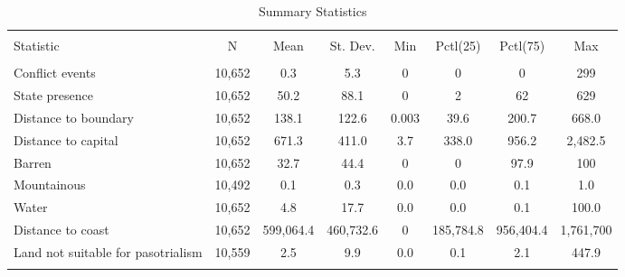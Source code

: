 
\begin{sidewaystable}[!htbp] \centering 
  \caption{Summary Statistics} 
  \label{summarystats} 
\begin{tabular}{@{\extracolsep{1pt}}lccccccc} 
\\[-1.8ex]\hline 
\hline \\[-1.8ex] 
Statistic & \multicolumn{1}{c}{N} & \multicolumn{1}{c}{Mean} & \multicolumn{1}{c}{St. Dev.} & \multicolumn{1}{c}{Min} & \multicolumn{1}{c}{Pctl(25)} & \multicolumn{1}{c}{Pctl(75)} & \multicolumn{1}{c}{Max} \\ 
\hline \\[-1.8ex] 
Conflict events & 10,652 & 0.3 & 5.3 & 0 & 0 & 0 & 299 \\ 
State presence & 10,652 & 50.2 & 88.1 & 0 & 2 & 62 & 629 \\ 
Distance to boundary & 10,652 & 138.1 & 122.6 & 0.003 & 39.6 & 200.7 & 668.0 \\ 
Distance to capital & 10,652 & 671.3 & 411.0 & 3.7 & 338.0 & 956.2 & 2,482.5 \\ 
Barren & 10,652 & 32.7 & 44.4 & 0 & 0 & 97.9 & 100 \\ 
Mountainous & 10,492 & 0.1 & 0.3 & 0.0 & 0.0 & 0.1 & 1.0 \\ 
Water & 10,652 & 4.8 & 17.7 & 0.0 & 0.0 & 0.1 & 100.0 \\ 
Distance to coast & 10,652 & 599,064.4 & 460,732.6 & 0 & 185,784.8 & 956,404.4 & 1,761,700 \\ 
Land not suitable for pasotrialism & 10,559 & 2.5 & 9.9 & 0.0 & 0.1 & 2.1 & 447.9 \\ 
\hline \\[-1.8ex] 
\end{tabular} 
\end{sidewaystable} 
